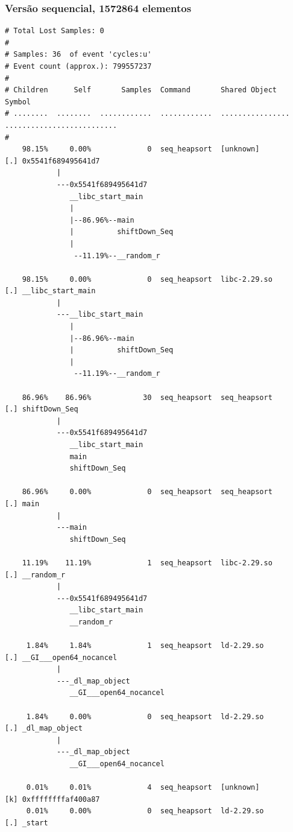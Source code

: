 \documentclass{article}
\begin{document}
\subsubsection{Versão sequencial, 1572864 elementos}
\scriptsize
\begin{verbatim}
# Total Lost Samples: 0
#
# Samples: 36  of event 'cycles:u'
# Event count (approx.): 799557237
#
# Children      Self       Samples  Command       Shared Object     Symbol
# ........  ........  ............  ............  ................  ..........................
#
    98.15%     0.00%             0  seq_heapsort  [unknown]         [.] 0x5541f689495641d7
            |
            ---0x5541f689495641d7
               __libc_start_main
               |
               |--86.96%--main
               |          shiftDown_Seq
               |
                --11.19%--__random_r

    98.15%     0.00%             0  seq_heapsort  libc-2.29.so      [.] __libc_start_main
            |
            ---__libc_start_main
               |
               |--86.96%--main
               |          shiftDown_Seq
               |
                --11.19%--__random_r

    86.96%    86.96%            30  seq_heapsort  seq_heapsort      [.] shiftDown_Seq
            |
            ---0x5541f689495641d7
               __libc_start_main
               main
               shiftDown_Seq

    86.96%     0.00%             0  seq_heapsort  seq_heapsort      [.] main
            |
            ---main
               shiftDown_Seq

    11.19%    11.19%             1  seq_heapsort  libc-2.29.so      [.] __random_r
            |
            ---0x5541f689495641d7
               __libc_start_main
               __random_r

     1.84%     1.84%             1  seq_heapsort  ld-2.29.so        [.] __GI___open64_nocancel
            |
            ---_dl_map_object
               __GI___open64_nocancel

     1.84%     0.00%             0  seq_heapsort  ld-2.29.so        [.] _dl_map_object
            |
            ---_dl_map_object
               __GI___open64_nocancel

     0.01%     0.01%             4  seq_heapsort  [unknown]         [k] 0xffffffffaf400a87
     0.01%     0.00%             0  seq_heapsort  ld-2.29.so        [.] _start
\end{verbatim}
\normalsize
\end{document}
